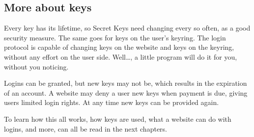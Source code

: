 \subsection{More about keys}
Every key has its lifetime, so Secret Keys need changing every so often, as a good security measure.
The same goes for keys on the user's keyring.
The login protocol is capable of changing keys on the website and keys on the keyring,
without any effort on the user side.
Well\ldots, a little program will do it for you, without you noticing.
\par
Logins can be granted,
but new keys may not be,
which results in the expiration of an account.
A website may deny a user new keys when payment is due,
giving users limited login rights.
At any time new keys can be provided again.
\par
\par
To learn how this all works,
how keys are used,
what a website can do with logins,
and more,
can all be read in the next chapters.
